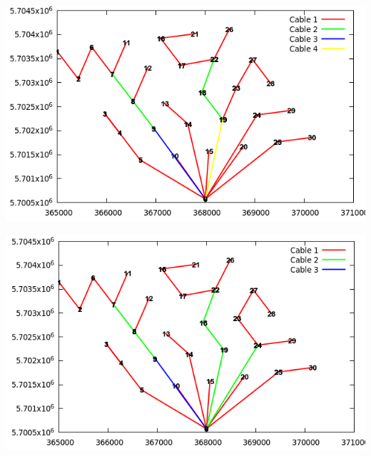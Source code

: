 \begin{minipage}{7cm} 
	\centering
	\includegraphics[scale=0.3]{Graphics/1opt-1.png} \\
	\label{img:1opt1}
	\end{minipage}
	\begin{minipage}{7cm} 
	\centering
	\includegraphics[scale=0.3]{Graphics/1opt-2.png} \\
	\label{img:1opt2}
	\end{minipage}

\newpage
